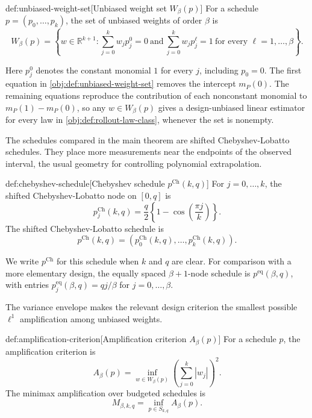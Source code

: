 \begin{definitionv}{def:unbiased-weight-set}[Unbiased weight set $W_\beta(p)$]
For a schedule \(p=(p_0,\ldots,p_k)\), the set of unbiased weights of order \(\beta\) is
\[
W_\beta(p)
=
\left\{
w\in\mathbb R^{k+1}:
\sum_{j=0}^k w_j p_j^0=0
\ \text{and}\
\sum_{j=0}^k w_j p_j^\ell=1
\ \text{for every } \ell=1,\ldots,\beta
\right\}.
\]
\end{definitionv}

Here \(p_j^0\) denotes the constant monomial \(1\) for every \(j\), including \(p_0=0\). The first equation in \cref{obj:def:unbiased-weight-set} removes the intercept \(m_P(0)\). The remaining equations reproduce the contribution of each nonconstant monomial to \(m_P(1)-m_P(0)\), so any \(w\in W_\beta(p)\) gives a design-unbiased linear estimator for every law in \cref{obj:def:rollout-law-class}, whenever the set is nonempty.

The schedules compared in the main theorem are shifted Chebyshev-Lobatto schedules. They place more measurements near the endpoints of the observed interval, the usual geometry for controlling polynomial extrapolation.

\begin{definitionv}{def:chebyshev-schedule}[Chebyshev schedule \(p^{\mathrm{Ch}}(k,q)\)]
For \(j=0,\ldots,k\), the shifted Chebyshev-Lobatto node on \([0,q]\) is
\[
p^{\mathrm{Ch}}_j(k,q)
=
\frac{q}{2}\left\{1-\cos\left(\frac{\pi j}{k}\right)\right\}.
\]
The shifted Chebyshev-Lobatto schedule is
\[
p^{\mathrm{Ch}}(k,q)
=
\left(p^{\mathrm{Ch}}_0(k,q),\ldots,p^{\mathrm{Ch}}_k(k,q)\right).
\]
\end{definitionv}

We write \(p^{\mathrm{Ch}}\) for this schedule when \(k\) and \(q\) are clear. For comparison with a more elementary design, the equally spaced \(\beta+1\)-node schedule is \(p^{\mathrm{eq}}(\beta,q)\), with entries \(p^{\mathrm{eq}}_j(\beta,q)=qj/\beta\) for \(j=0,\ldots,\beta\).

The variance envelope makes the relevant design criterion the smallest possible \(\ell^1\) amplification among unbiased weights.

\begin{definitionv}{def:amplification-criterion}[Amplification criterion \(A_\beta(p)\)]
For a schedule \(p\), the amplification criterion is
\[
A_\beta(p)
=
\inf_{w\in W_\beta(p)}
\left(\sum_{j=0}^k |w_j|\right)^2.
\]
The minimax amplification over budgeted schedules is
\[
M_{\beta,k,q}
=
\inf_{p\in S_{k,q}} A_\beta(p).
\]
\end{definitionv}

